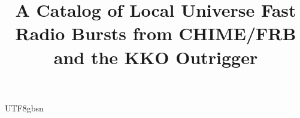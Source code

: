 \documentclass[twocolumn,linenumbers]{aastex631}
\begin{document}
\begin{CJK*}{UTF8}{gbsn}

\title{A Catalog of Local Universe Fast Radio Bursts from CHIME/FRB and the KKO Outrigger}





\end{CJK*}
\end{document}
